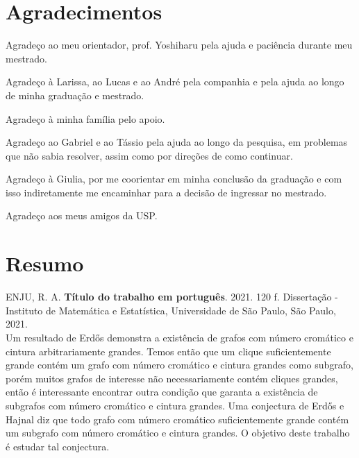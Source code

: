 \documentclass[11pt,twoside,a4paper]{book}
\begin{document}

\chapter*{Agradecimentos}


Agradeço ao meu orientador, prof. Yoshiharu pela ajuda e paciência durante meu mestrado.

Agradeço à Larissa, ao Lucas e ao André pela companhia e pela ajuda ao longo de minha graduação e mestrado.

Agradeço à minha família pelo apoio.

Agradeço ao Gabriel e ao Tássio pela ajuda ao longo da pesquisa, em problemas que não sabia resolver, assim como por direções de como continuar.

Agradeço à Giulia, por me coorientar em minha conclusão da graduação e com isso indiretamente me encaminhar para a decisão de ingressar no mestrado.

Agradeço aos meus amigos da USP.


\chapter*{Resumo}

\noindent ENJU, R. A. \textbf{Título do trabalho em português}. 
2021. 120 f.
Dissertação - Instituto de Matemática e Estatística,
Universidade de São Paulo, São Paulo, 2021.
\\

Um resultado de Erd\H{o}s demonstra a existência de grafos com número cromático e cintura arbitrariamente grandes. Temos então que um clique suficientemente grande contém um grafo com número cromático e cintura grandes como subgrafo, porém muitos grafos de interesse não necessariamente contém cliques grandes, então é interessante encontrar outra condição que garanta a existência de subgrafos com número cromático e cintura grandes. Uma conjectura de Erd\H{o}s e Hajnal diz que todo grafo com número cromático suficientemente grande contém um subgrafo com número cromático e cintura grandes. O objetivo deste trabalho é estudar tal conjectura.
\end{document}
